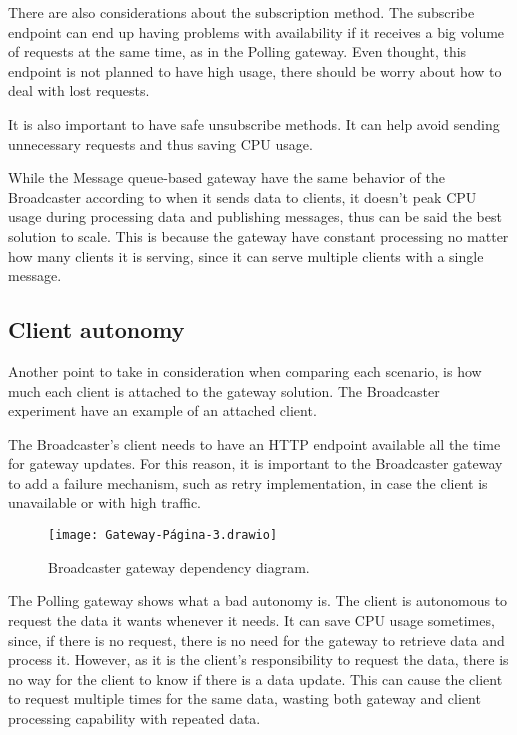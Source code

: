 There are also considerations about the subscription method. The subscribe endpoint can end up having  problems with availability if it receives a big volume of requests at the same time, as in the Polling gateway. Even thought, this endpoint is not planned to have high usage, there should be worry about how to deal with lost requests.

It is also important to have safe unsubscribe methods. It can help avoid sending unnecessary requests and thus saving CPU usage.

While the Message queue-based gateway have the same behavior of the Broadcaster according to when it sends data to clients, it doesn't peak CPU usage during processing data and publishing messages, thus can be said the best solution to scale. This is because the gateway have constant processing no matter how many clients it is serving, since it can serve multiple clients with a single message.

\subsection*{Client autonomy}
\label{sec:client}

Another point to take in consideration when comparing each scenario, is how much each client is attached to the gateway solution. The Broadcaster experiment have an example of an attached client.

The Broadcaster's client needs to have an HTTP endpoint available all the time for gateway updates. For this reason, it is important to the Broadcaster gateway to add a failure mechanism, such as retry implementation, in case the client is unavailable or with high traffic.

\begin{figure}
    \centering
    \texttt{[image: Gateway-Página-3.drawio]}
    \caption{Broadcaster gateway dependency diagram.\label{fig:subfigures6}}
\end{figure}

The Polling gateway shows what a bad autonomy is. The client is autonomous to request the data it wants whenever it needs. It can save CPU usage sometimes, since, if there is no request, there is no need for the gateway to retrieve data and process it. However, as it is the client's responsibility to request the data, there is no way for the client to know if there is a data update. This can cause the client to request multiple times for the same data, wasting both gateway and client processing capability with repeated data.

